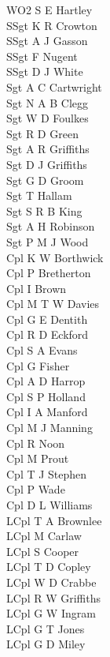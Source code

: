 \begin{multicols}{2}
  \noindent
  WO2 S E Hartley \\
  SSgt K R Crowton \\
  SSgt A J Gasson \\
  SSgt F Nugent \\
  SSgt D J White \\
  Sgt A C Cartwright \\
  Sgt N A B Clegg \\
  Sgt W D Foulkes \\
  Sgt R D Green \\
  Sgt A R Griffiths \\
  Sgt D J Griffiths \\
  Sgt G D Groom \\
  Sgt T Hallam \\
  Sgt S R B King \\
  Sgt A H Robinson \\
  Sgt P M J Wood \\
  Cpl K W Borthwick \\
  Cpl P Bretherton \\
  Cpl I Brown \\
  Cpl M T W Davies \\
  Cpl G E Dentith \\
  Cpl R D Eckford \\
  Cpl S A Evans \\
  Cpl G Fisher \\
  Cpl A D Harrop \\
  Cpl S P Holland \\
  Cpl I A Manford \\
  Cpl M J Manning \\
  Cpl R Noon \\
  Cpl M Prout \\
  Cpl T J Stephen \\
  Cpl P Wade \\
  Cpl D L Williams \\
  LCpl T A Brownlee \\
  LCpl M Carlaw \\
  LCpl S Cooper \\
  LCpl T D Copley \\
  LCpl W D Crabbe \\
  LCpl R W Griffiths \\
  LCpl G W Ingram \\
  LCpl G T Jones \\
  LCpl G D Miley \\

\end{multicols}
